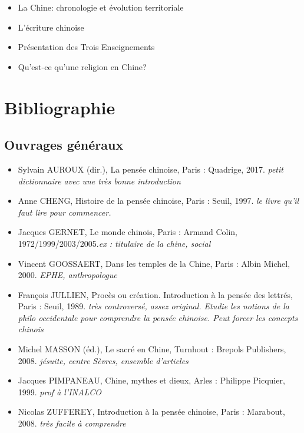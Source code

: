 \begin{itemize}
    \item  	La Chine: chronologie et évolution territoriale
    \item 	L’écriture chinoise
    \item 	Présentation des Trois Enseignements
    \item 	Qu’est-ce qu’une religion en Chine?

\end{itemize}


\section{Bibliographie}
 
\subsection{Ouvrages généraux}
\begin{itemize}
    \item Sylvain AUROUX (dir.), La pensée chinoise, Paris : Quadrige, 2017. \textit{petit dictionnaire avec une très bonne introduction}
    \item Anne CHENG, Histoire de la pensée chinoise, Paris : Seuil, 1997. \textit{le livre qu'il faut lire pour commencer.}
    \item Jacques GERNET, Le monde chinois, Paris : Armand Colin, 1972/1999/2003/2005.\textit{ex : titulaire de la chine, social}
    \item Vincent GOOSSAERT, Dans les temples de la Chine, Paris : Albin Michel, 2000. \textit{EPHE, anthropologue}
    \item François JULLIEN, Procès ou création. Introduction à la pensée des lettrés, Paris : Seuil, 1989. \textit{très controversé, assez original. Etudie les notions de la philo occidentale pour comprendre la pensée chinoise. Peut forcer les concepts chinois}
    \item Michel MASSON (éd.), Le sacré en Chine, Turnhout : Brepols Publishers, 2008. \textit{jésuite, centre Sèvres, ensemble d'articles}
    \item Jacques PIMPANEAU, Chine, mythes et dieux, Arles : Philippe Picquier, 1999. \textit{prof à l'INALCO}
    \item Nicolas ZUFFEREY, Introduction à la pensée chinoise, Paris : Marabout, 2008. \textit{très facile à comprendre}
\end{itemize}








